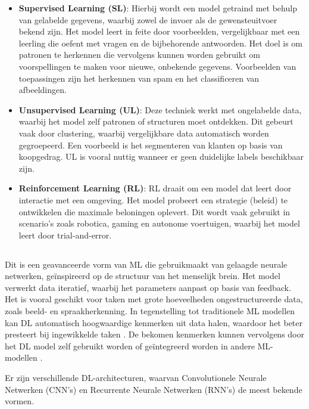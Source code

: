 \begin{itemize}
  \item \textbf{Supervised Learning (SL)}: Hierbij wordt een model getraind met behulp van gelabelde gegevens, waarbij zowel de invoer als de gewensteuitvoer bekend zijn. Het model leert in feite door voorbeelden, vergelijkbaar met een leerling die oefent met vragen en de bijbehorende antwoorden. Het doel is om patronen te herkennen die vervolgens kunnen worden gebruikt om voorspellingen te maken voor nieuwe, onbekende gegevens. Voorbeelden van toepassingen zijn het herkennen van spam en het classificeren van afbeeldingen.
  \item \textbf{Unsupervised Learning (UL)}: Deze techniek werkt met ongelabelde data, waarbij het model zelf patronen of structuren moet ontdekken. Dit gebeurt vaak door clustering, waarbij vergelijkbare data automatisch worden gegroepeerd. Een voorbeeld is het segmenteren van klanten op basis van koopgedrag. UL is vooral nuttig wanneer er geen duidelijke labels beschikbaar zijn. 
  \item \textbf{Reinforcement Learning (RL)}: RL draait om een model dat leert door interactie met een omgeving. Het model probeert een strategie (beleid) te ontwikkelen die maximale beloningen oplevert. Dit wordt vaak gebruikt in scenario's zoals robotica, gaming en autonome voertuigen, waarbij het model leert door trial-and-error. 
\end{itemize}

\subsection{}%
\label{subsec:deep-learning}

Dit is een geavanceerde vorm van ML die gebruikmaakt van gelaagde neurale netwerken, geïnspireerd op de structuur van het menselijk brein.
Het model verwerkt data iteratief, waarbij het parameters aanpast op basis van feedback.  
Het is vooral geschikt voor taken met grote hoeveelheden ongestructureerde data, zoals beeld- en spraakherkenning. 
In tegenstelling tot traditionele ML modellen kan DL automatisch hoogwaardige kenmerken uit data halen, waardoor het beter presteert bij ingewikkelde taken \autocite{SharifaniEtAl2023}.
De bekomen kenmerken kunnen vervolgens door het DL model zelf gebruikt worden of geïntegreerd worden in andere ML-modellen \autocite{JanieschEtAl2021}. 

Er zijn verschillende DL-architecturen, waarvan Convolutionele Neurale Netwerken (CNN's) en Recurrente Neurale Netwerken (RNN's) de meest bekende vormen.

